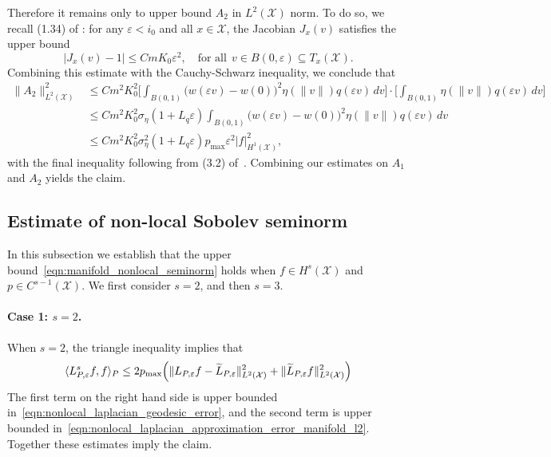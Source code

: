 \documentclass[aos]{imsart}
\theoremstyle{plain}
\theoremstyle{definition}
\theoremstyle{remark}
\newcommand{\dotp}[2]{\langle #1, #2 \rangle}
\newcommand{\wt}[1]{\widetilde{#1}}
\newcommand{\mc}[1]{\mathcal{#1}}
\newcommand{\1}{\mathbf{1}}
\begin{document}
Therefore it remains only to upper bound $A_2$ in $L^2(\mc{X})$ norm. To do so, we recall (1.34) of \cite{trillos2019}: for any $\varepsilon < i_0$ and all $x \in \mc{X}$, the Jacobian $J_x(v)$ satisfies the upper bound
\begin{equation*}
|J_x(v) - 1| \leq CmK_0\varepsilon^2, \quad  \textrm{for all} ~~ v \in B(0,\varepsilon) \subseteq T_x(\mc{X}).
\end{equation*}
Combining this estimate with the Cauchy-Schwarz inequality, we conclude that
\begin{align*}
\|A_2\|_{L^2(\mc{X})}^2 & \leq Cm^2K_0^2 \biggl[\int_{B(0,1)} \bigl(w(\varepsilon v) - w(0)\bigr)^2 \eta(\|v\|) q(\varepsilon v) \,dv\biggr] \cdot \biggl[\int_{B(0,1)} \eta(\|v\|) q(\varepsilon v) \,dv\biggr] \\
& \leq Cm^2K_0^2 \sigma_{\eta} (1 + L_q\varepsilon)  \int_{B(0,1)} \bigl(w(\varepsilon v) - w(0)\bigr)^2 \eta(\|v\|) q(\varepsilon v) \,dv \\
& \leq Cm^2K_0^2 \sigma_{\eta}^2 (1 + L_q\varepsilon) p_{\max}  \varepsilon^2 |f|_{H^1(\mc{X})}^2,
\end{align*}
with the final inequality following from (3.2) of~\cite{burago2014}. Combining our estimates on $A_1$ and $A_2$ yields the claim.

\subsection{Estimate of non-local Sobolev seminorm}
\label{subsec:manifold_estimate_nonlocal_seminorm}
In this subsection we establish that the upper bound~\eqref{eqn:manifold_nonlocal_seminorm} holds when $f \in H^s(\mc{X})$ and $p \in C^{s - 1}(\mc{X})$. We first consider $s = 2$, and then $s = 3$.

\paragraph{Case 1: $s = 2$.}
When $s = 2$, the triangle inequality implies that
\begin{equation*}
\dotp{L_{P,\varepsilon}^sf}{f}_P \leq 2p_{\max}\Bigl(\|L_{P,\varepsilon}f - \wt{L}_{P,\varepsilon}\|_{L^2(\mc{X})}^2 + \|\wt{L}_{P,\varepsilon}f\|_{L^2(\mc{X})}^2\Bigr)
\end{equation*}
The first term on the right hand side is upper bounded in~\eqref{eqn:nonlocal_laplacian_geodesic_error}, and the second term is upper bounded in~\eqref{eqn:nonlocal_laplacian_approximation_error_manifold_l2}. Together these estimates imply the claim.
\end{document}
